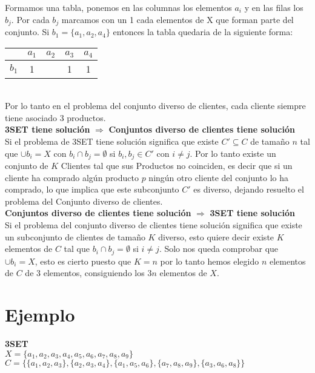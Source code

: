 \documentclass[11pt]{article}
\begin{document}
Formamos una tabla, ponemos en las columnas los elementos $a_i$ y en las filas los $b_j$. 
Por cada $b_j$ marcamos con un 1 cada elementos de X que forman parte del conjunto. Si $b_1 = \{ a_1, a_2, a_4 \} $ entonces la tabla quedaria de la siguiente forma:
\begin{table}[h]
\centering
\begin{tabular}{c|c|c|c|c|}
\cline{2-5}
                            & $a_1$ & $a_2$ & $a_3$ & $a_4$ \\ \hline
\multicolumn{1}{|c|}{$b_1$} & 1     &       & 1     & 1     \\ \hline
\end{tabular}
\end{table}
\\
Por lo tanto en el problema del conjunto diverso de clientes, cada cliente siempre tiene asociado 3 productos.
\\
\textbf{3SET tiene solución} $\Rightarrow$ \textbf{Conjuntos diverso de clientes tiene solución} \\
Si el problema de 3SET tiene solución significa que existe $C' \subseteq C$ de tamaño $n$ tal que $\cup b_i = X$ con $b_i \cap b_j = \emptyset $ si $b_i, b_j \in C'$ con $i\neq j$. Por lo tanto existe un conjunto de $K$ Clientes tal que sus Productos no coinciden, es decir que si un cliente ha comprado algún producto $p$ ningún otro cliente del conjunto lo ha comprado, lo que implica que este subconjunto $C'$ es diverso, dejando resuelto el problema del Conjunto diverso de clientes.
\\
\textbf{Conjuntos diverso de clientes tiene solución} $\Rightarrow$ \textbf{3SET tiene solución} \\ 
Si el problema del conjunto diverso de clientes tiene solución significa que existe un subconjunto de clientes de tamaño $K$ diverso, esto quiere decir existe $K$ elementos de $C$  tal que $b_i \cap b_j = \emptyset$ si $i \neq j$. Solo nos queda comprobar que $\cup b_i = X$, esto es cierto puesto que $K = n$ por lo tanto hemos elegido $n$ elementos de $C$ de 3 elementos, consiguiendo los $3n$ elementos de $X$.\\
\section*{Ejemplo}
\textbf{3SET} \\
$X = \{a_1, a_2, a_3, a_4, a_5, a_6, a_7, a_8, a_9\}$ \\
$C = \Big\{ \{a_1, a_2, a_3 \}, \{a_2, a_3, a_4 \}, \{ a_1, a_5, a_6 \}, \{a_7,a_8,a_9\}, \{a_3,a_6,a_8\} \Big\}$
\end{document}
